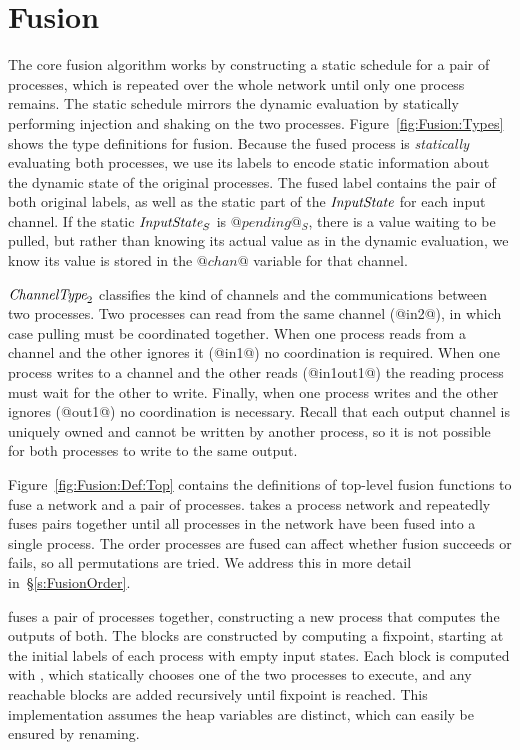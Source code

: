 \section{Fusion}
\label{s:Fusion}




The core fusion algorithm works by constructing a static schedule for a pair of processes, which is repeated over the whole network until only one process remains.
The static schedule mirrors the dynamic evaluation by statically performing injection and shaking on the two processes.
Figure~\ref{fig:Fusion:Types} shows the type definitions for fusion.
Because the fused process is \emph{statically} evaluating both processes, we use its labels to encode static information about the dynamic state of the original processes.
The fused label contains the pair of both original labels, as well as the static part of the $\textit{InputState}$ for each input channel.
If the static $\textit{InputState}_S$ is $@pending@_S$, there is a value waiting to be pulled, but rather than knowing its actual value as in the dynamic evaluation, we know its value is stored in the $@chan@$ variable for that channel.

$\textit{ChannelType}_2$ classifies the kind of channels and the communications between two processes.
Two processes can read from the same channel (@in2@), in which case pulling must be coordinated together.
When one process reads from a channel and the other ignores it (@in1@) no coordination is required.
When one process writes to a channel and the other reads (@in1out1@) the reading process must wait for the other to write.
Finally, when one process writes and the other ignores (@out1@) no coordination is necessary.
Recall that each output channel is uniquely owned and cannot be written by another process, so it is not possible for both processes to write to the same output.

Figure~\ref{fig:Fusion:Def:Top} contains the definitions of top-level fusion functions to fuse a network and a pair of processes.
 takes a process network and repeatedly fuses pairs together until all processes in the network have been fused into a single process.
The order processes are fused can affect whether fusion succeeds or fails, so all permutations are tried.
We address this in more detail in~\S\ref{s:FusionOrder}.

 fuses a pair of processes together, constructing a new process that computes the outputs of both.
The blocks are constructed by computing a fixpoint, starting at the initial labels of each process with empty input states.
Each block is computed with , which statically chooses one of the two processes to execute, and any reachable blocks are added recursively until fixpoint is reached.
This implementation assumes the heap variables are distinct, which can easily be ensured by renaming.



